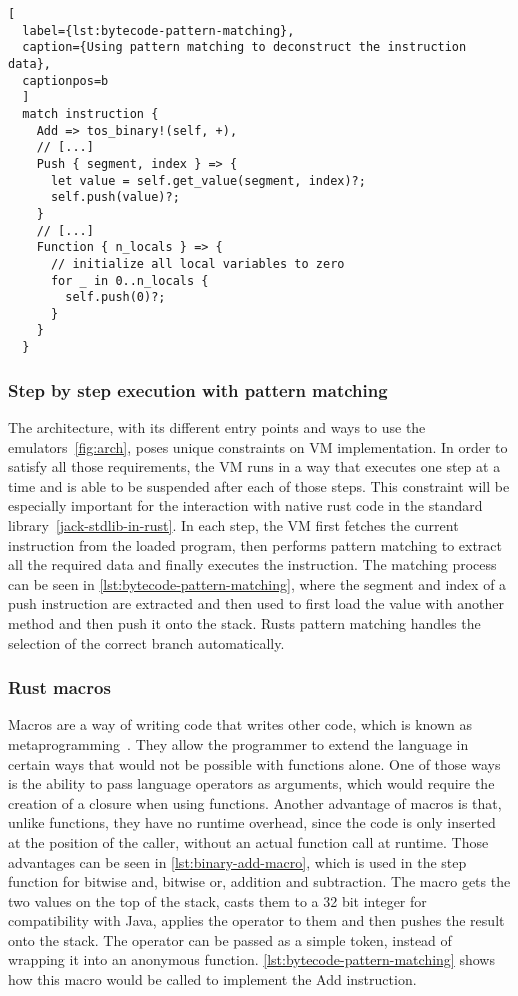 \begin{lstlisting}[
  label={lst:bytecode-pattern-matching},
  caption={Using pattern matching to deconstruct the instruction data},
  captionpos=b
  ]
  match instruction {
    Add => tos_binary!(self, +),
    // [...]
    Push { segment, index } => {
      let value = self.get_value(segment, index)?;
      self.push(value)?;
    }
    // [...]
    Function { n_locals } => {
      // initialize all local variables to zero
      for _ in 0..n_locals {
        self.push(0)?;
      }
    }
  }
\end{lstlisting}

\subsubsection{Step by step execution with pattern matching}
The architecture, with its different entry points and ways to use the emulators~\ref{fig:arch}, poses unique constraints on VM implementation. In order to satisfy all those requirements, the VM runs in a way that executes one step at a time and is able to be suspended after each of those steps. This constraint will be especially important for the interaction with native rust code in the standard library~\ref{jack-stdlib-in-rust}.
In each step, the VM first fetches the current instruction from the loaded program, then performs pattern matching to extract all the required data and finally executes the instruction.
The matching process can be seen in \cref{lst:bytecode-pattern-matching}, where the segment and index of a push instruction are extracted and then used to first load the value with another method and then push it onto the stack.
Rusts pattern matching handles the selection of the correct branch automatically.

\subsubsection{Rust macros}
Macros are a way of writing code that writes other code, which is known as metaprogramming~\cite[Chapter~19.5]{klabnik2019rust}.
They allow the programmer to extend the language in certain ways that would not be possible with functions alone.
One of those ways is the ability to pass language operators as arguments, which would require the creation of a closure when using functions.
Another advantage of macros is that, unlike functions, they have no runtime overhead, since the code is only inserted at the position of the caller, without an actual function call at runtime.
Those advantages can be seen in \cref{lst:binary-add-macro}, which is used in the step function for bitwise and, bitwise or, addition and subtraction. The macro gets the two values on the top of the stack, casts them to a 32 bit integer for compatibility with Java, applies the operator to them and then pushes the result onto the stack.
The operator can be passed as a simple token, instead of wrapping it into an anonymous function.
\cref{lst:bytecode-pattern-matching} shows how this macro would be called to implement the Add instruction.

